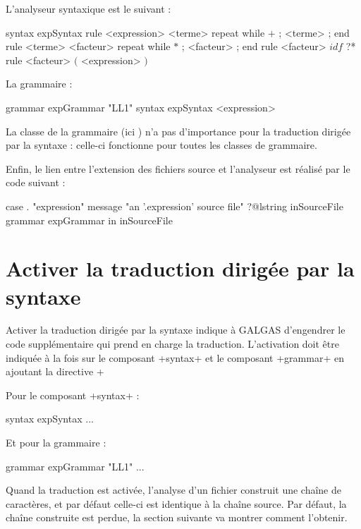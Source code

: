 L'analyseur syntaxique est le suivant :
\begin{galgas}
syntax expSyntax {
  rule <expression> {
    <terme>
    repeat while $+$ ; <terme> ; end
  }
  rule <terme> {
    <facteur>
    repeat while $*$ ; <facteur> ; end
  }
  rule <facteur> {
    $idf$ ?*
  }
  rule <facteur> {
    $($
    <expression>
    $)$
  }
}
\end{galgas}

La grammaire :
\begin{galgas}
grammar expGrammar "LL1" {
  syntax expSyntax
  <expression>
}
\end{galgas}

La classe de la grammaire (ici ) n'a pas d'importance pour la traduction dirigée par la syntaxe : celle-ci fonctionne pour toutes les classes de grammaire. 

Enfin, le lien entre l'extension des fichiers source et l'analyseur est réalisé par le code suivant :
\begin{galgas}
case . "expression"
message "an '.expression' source file"
?@lstring inSourceFile {
  grammar expGrammar in inSourceFile
}
\end{galgas}








\section{Activer la traduction dirigée par la syntaxe}

Activer la traduction dirigée par la syntaxe indique à GALGAS d'engendrer le code supplémentaire qui prend en charge la traduction. L'activation doit être indiquée à la fois sur le composant \ggs+syntax+ et le composant \ggs+grammar+ en ajoutant la directive \ggs+%

Pour le composant \ggs+syntax+ :
\begin{galgas}
syntax expSyntax %
  ...
\end{galgas}

Et pour la grammaire :
\begin{galgas}
grammar expGrammar "LL1" %
  ...
\end{galgas}

Quand la traduction est activée, l'analyse d'un fichier construit une chaîne de caractères, et par défaut celle-ci est identique à la chaîne source. Par défaut, la chaîne construite est perdue, la section suivante va montrer comment l'obtenir.








